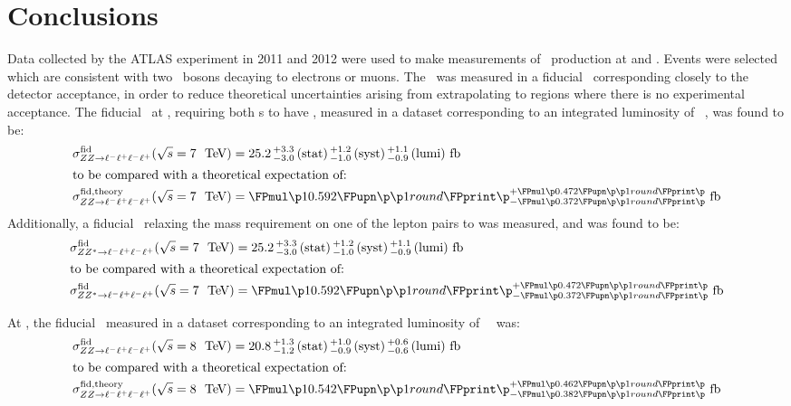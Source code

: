 \graphicspath{{Chapters/Conclusions/Figures/}}
\chapter{Conclusions}
\label{chap:Conclusions}
Data collected by the ATLAS experiment in 2011 and 2012 were used to make
measurements of \ZZ\ production at  and .
Events were selected which are consistent with two \Z\ bosons decaying to
electrons or muons. The \cx\ was measured in a fiducial \phasespace\
corresponding closely to the detector acceptance, in order to reduce theoretical
uncertainties arising from extrapolating to regions where there is no
experimental acceptance.
The fiducial \cx\ at \sqrtseq{7}, requiring both \leppair s to have \sstooos, measured in a
dataset corresponding to an integrated luminosity of
\LumiPassGRLTwentyEleven~\ifb, was found to be:
\begin{align}
\sigmaFidZZllll(\sqrtseq{7}) &= \ZZSevenTeVFiducialCrossSectionZZLLLL \\
\intertext{to be compared with a theoretical expectation of:}
\sigmaFidTheoryZZllll(\sqrtseq{7}) &= \ZZSevenTeVTheoryFiducialCrossSectionZZLLLL
\end{align}
Additionally, a fiducial \cx\ relaxing the mass requirement on one of the lepton pairs
to \mllgtt was measured, and was found to be:
\begin{align}
\sigmaFidZZsllll(\sqrtseq{7}) &= \ZZSevenTeVFiducialCrossSectionZZLLLL \\
\intertext{to be compared with a theoretical expectation of:}
\sigmaFidZZsllll(\sqrtseq{7}) &= \ZZSevenTeVTheoryFiducialCrossSectionZZLLLL
\end{align}

At , the fiducial \cx\ measured in a dataset corresponding to an integrated luminosity of
\LumiPassGRLTwentyTwelve~\ifb\ was:
\begin{align}
\sigmaFidZZllll(\sqrtseq{8}) &= \ZZEightTeVFiducialCrossSectionZZLLLL \\
\intertext{to be compared with a theoretical expectation of:}
\sigmaFidTheoryZZllll(\sqrtseq{8}) &= \ZZEightTeVTheoryFiducialCrossSectionZZLLLL
\end{align}

